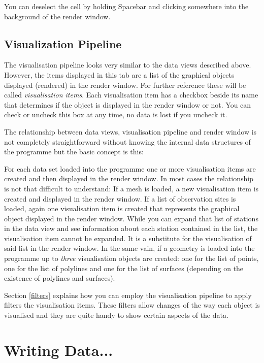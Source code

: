 You can deselect the cell by holding Spacebar and clicking somewhere into the background of the render window.

\subsection{Visualization Pipeline}

The visualisation pipeline looks very similar to the data views described above. However, the items displayed in this tab are a list of the graphical objects displayed (rendered) in the render window. For further reference these will be called \emph{visualisation items}. Each visualisation item has a checkbox beside its name that determines if the object is displayed in the render window or not. You can check or uncheck this box at any time, no data is lost if you uncheck it.

The relationship between data views, visualisation pipeline and render window is not completely straightforward without knowing the internal data structures of the programme but the basic concept is this:

For each data set loaded into the programme one or more visualisation items are created and then displayed in the render window. In most cases the relationship is not that difficult to understand: If a mesh is loaded, a new visualisation item is created and displayed in the render window. If a list of observation sites is loaded, again one visualisation item is created that represents the graphical object displayed in the render window. While you can expand that list of stations in the data view and see information about each station contained in the list, the visualisation item cannot be expanded. It is a substitute for the visualisation of said list in the render window. In the same vain, if a geometry is loaded into the programme up to \emph{three} visualisation objects are created: one for the list of points, one for the list of polylines and one for the list of surfaces (depending on the existence of polylines and surfaces).

Section \ref{filters} explains how you can employ the visualisation pipeline to apply filters the visualisation items. These filters allow changes of the way each object is visualised and they are quite handy to show certain aspects of the data.

\section{Writing Data...}

